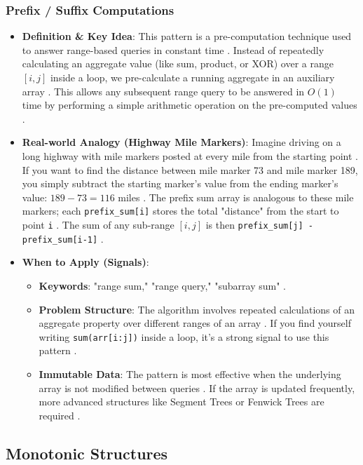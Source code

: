 \documentclass{article}
\begin{document}
\subsubsection{Prefix / Suffix Computations}
\begin{itemize}
\item \textbf{Definition \& Key Idea}: This pattern is a pre-computation technique used to answer range-based queries in constant time \cite{142}. Instead of repeatedly calculating an aggregate value (like sum, product, or XOR) over a range $[i, j]$ inside a loop, we pre-calculate a running aggregate in an auxiliary array \cite{143}. This allows any subsequent range query to be answered in $O(1)$ time by performing a simple arithmetic operation on the pre-computed values \cite{144}.
\item \textbf{Real-world Analogy (Highway Mile Markers)}: Imagine driving on a long highway with mile markers posted at every mile from the starting point \cite{145}. If you want to find the distance between mile marker 73 and mile marker 189, you simply subtract the starting marker's value from the ending marker's value: $189-73=116$ miles \cite{146, 147}. The prefix sum array is analogous to these mile markers; each \texttt{prefix\_sum[i]} stores the total "distance" from the start to point \texttt{i} \cite{148, 149}. The sum of any sub-range $[i, j]$ is then \texttt{prefix\_sum[j] - prefix\_sum[i-1]} \cite{150}.
\item \textbf{When to Apply (Signals)}:
\begin{itemize}
\item \textbf{Keywords}: "range sum," "range query," "subarray sum" \cite{153}.
\item \textbf{Problem Structure}: The algorithm involves repeated calculations of an aggregate property over different ranges of an array \cite{154}. If you find yourself writing \texttt{sum(arr[i:j])} inside a loop, it's a strong signal to use this pattern \cite{155}.
\item \textbf{Immutable Data}: The pattern is most effective when the underlying array is not modified between queries \cite{156}. If the array is updated frequently, more advanced structures like Segment Trees or Fenwick Trees are required \cite{157}.
\end{itemize}
\end{itemize}

\subsection{Monotonic Structures}
\end{document}
